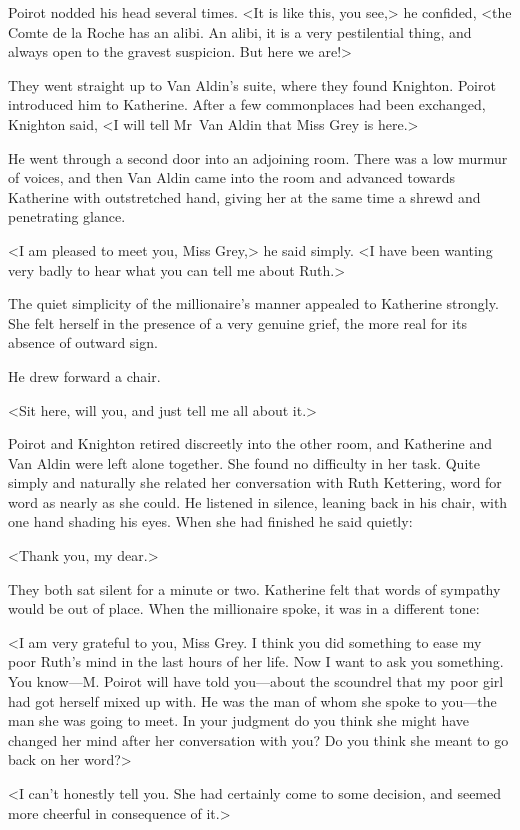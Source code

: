 Poirot nodded his head several times. <It is like this, you see,> he confided, <the Comte de la Roche has an alibi. An alibi, it is a very pestilential thing, and always open to the gravest suspicion. But here we are!>

They went straight up to Van Aldin's suite, where they found Knighton. Poirot introduced him to Katherine. After a few commonplaces had been exchanged, Knighton said, <I will tell Mr~Van Aldin that Miss Grey is here.>

He went through a second door into an adjoining room. There was a low murmur of voices, and then Van Aldin came into the room and advanced towards Katherine with outstretched hand, giving her at the same time a shrewd and penetrating glance.

<I am pleased to meet you, Miss Grey,> he said simply. <I have been wanting very badly to hear what you can tell me about Ruth.>

The quiet simplicity of the millionaire's manner appealed to Katherine strongly. She felt herself in the presence of a very genuine grief, the more real for its absence of outward sign.

He drew forward a chair.

<Sit here, will you, and just tell me all about it.>

Poirot and Knighton retired discreetly into the other room, and Katherine and Van Aldin were left alone together. She found no difficulty in her task. Quite simply and naturally she related her conversation with Ruth Kettering, word for word as nearly as she could. He listened in silence, leaning back in his chair, with one hand shading his eyes. When she had finished he said quietly:

<Thank you, my dear.>

They both sat silent for a minute or two. Katherine felt that words of sympathy would be out of place. When the millionaire spoke, it was in a different tone:

<I am very grateful to you, Miss Grey. I think you did something to ease my poor Ruth's mind in the last hours of her life. Now I want to ask you something. You know—M. Poirot will have told you—about the scoundrel that my poor girl had got herself mixed up with. He was the man of whom she spoke to you—the man she was going to meet. In your judgment do you think she might have changed her mind after her conversation with you? Do you think she meant to go back on her word?>

<I can't honestly tell you. She had certainly come to some decision, and seemed more cheerful in consequence of it.>

